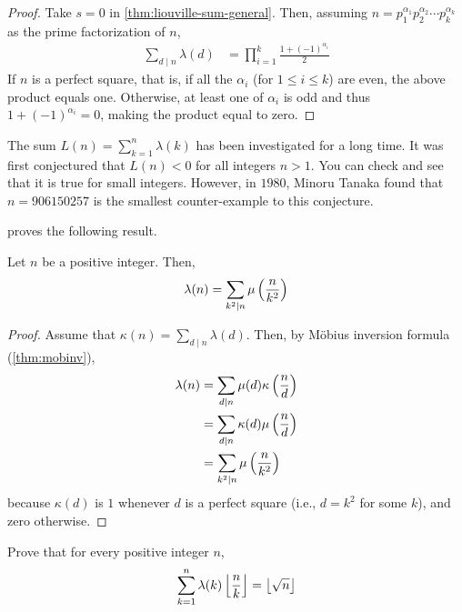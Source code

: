 	\begin{proof}
		Take $s=0$ in \autoref{thm:liouville-sum-general}. Then, assuming $n= p_1^{\alpha_1} p_2^{\alpha_2} \cdots p_k^{\alpha_k}$ as the prime factorization of $n$,
			\begin{align*}
				\sum_{d\mid n}\lambda(d) &= \prod_{i=1}^{k}\frac{1 + (-1)^{\alpha_i}}{2}
			\end{align*}
		If $n$ is a perfect square, that is, if all the $\alpha_i$ (for $1 \leq i \leq k$) are even, the above product equals one. Otherwise, at least one of $\alpha_i$ is odd and thus $1 + (-1)^{\alpha_i}=0$, making the product equal to zero.
	\end{proof}

	\begin{remark}
		The sum $L(n)= \sum\limits_{k=1}^{n} \lambda(k)$ has been investigated for a long time. It was first conjectured that $L(n) <0$ for all integers $n >1$. You can check and see that it is true for small integers. However, in $1980$, Minoru Tanaka found that $n=906150257$ is the smallest counter-example to this conjecture.
	\end{remark}
\textcite[Proposition $2.2$]{panaitopol_2001} proves the following result.
	\begin{theorem}
		Let $n$ be a positive integer. Then,
			\begin{align*}
				\lambda(n) = \sum_{k^2\mid n}\mu\left(\frac{n}{k^2}\right)
			\end{align*}
	\end{theorem}

	\begin{proof}
		Assume that $\displaystyle \kappa(n)=\sum\limits_{d\mid n}\lambda(d)$. Then, by M\"{o}bius inversion formula (\autoref{thm:mobinv}),
			\begin{align*}
				\lambda(n) &= \sum_{d\mid n}\mu(d)\kappa\left(\frac nd\right)\\
			  &= \sum_{d\mid n}\kappa(d)\mu\left(\frac nd\right)\\
			  &= \sum_{k^2\mid n}\mu\left(\frac{n}{k^2}\right)
			\end{align*}
		because $\kappa(d)$ is $1$ whenever $d$ is a perfect square (i.e., $d=k^2$ for some $k$), and zero otherwise.
	\end{proof}

	\begin{theorem}\label{thm:liouville-square-floor}
		Prove that for every positive integer $n$,
			\begin{align*}
				\sum_{k=1}^{n} \lambda(k)\left\lfloor{\frac{n}{k}}\right\rfloor = \left\lfloor{\sqrt{n}}\right\rfloor
			\end{align*}
	\end{theorem}

